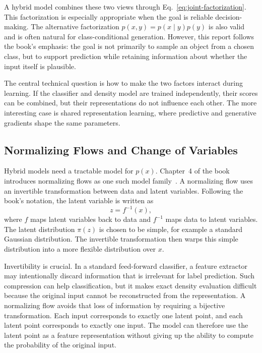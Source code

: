 \documentclass[runningheads]{llncs}
\begin{document}
A hybrid model combines these two views through
Eq.~\eqref{eq:joint-factorization}. This factorization is especially appropriate
when the goal is reliable decision-making. The alternative factorization
\(p(x,y)=p(x\mid y)p(y)\) is also valid and is often natural for
class-conditional generation. However, this report follows the book's emphasis:
the goal is not primarily to sample an object from a chosen class, but to support
prediction while retaining information about whether the input itself is
plausible.

The central technical question is how to make the two factors interact during
learning. If the classifier and density model are trained independently, their
scores can be combined, but their representations do not influence each other.
The more interesting case is shared representation learning, where predictive
and generative gradients shape the same parameters.

\subsection{Normalizing Flows and Change of Variables}

Hybrid models need a tractable model for \(p(x)\). Chapter~4 of the book
introduces normalizing flows as one such model family~\cite{tomczak2024deep}. A
normalizing flow uses an invertible transformation between data and latent
variables. Following the book's notation, the latent variable is written as
\[
z=f^{-1}(x),
\]
where \(f\) maps latent variables back to data and \(f^{-1}\) maps data to
latent variables. The latent distribution \(\pi(z)\) is chosen to be simple, for
example a standard Gaussian distribution. The invertible transformation then
warps this simple distribution into a more flexible distribution over \(x\).

Invertibility is crucial. In a standard feed-forward classifier, a
feature extractor may intentionally discard information that is irrelevant for
label prediction. Such compression can help classification, but it makes exact
density evaluation difficult because the original input cannot be reconstructed
from the representation. A normalizing flow avoids that loss of information by
requiring a bijective transformation. Each input corresponds to exactly one
latent point, and each latent point corresponds to exactly one input. The model
can therefore use the latent point as a feature representation without giving up
the ability to compute the probability of the original input.
\end{document}
